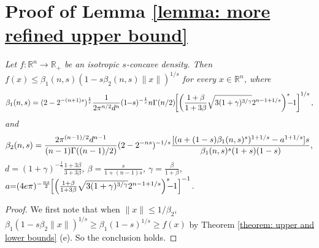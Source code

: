 \documentclass[11pt]{article}
\newcommand{\R}{\mathbb{R}}
\newcommand{\red}[1]{{\color{black}#1}}
\begin{document}
{{{{\section{Proof of Lemma \ref{lemma: more refined upper bound}}
\label{section: proof of more refined upper bound}

\emph{Let $f:\R^n\rightarrow \R_+$ be an isotropic $s$-concave density. Then $f(x)\le \beta_1(n,s)(1-s\beta_2(n,s)\|x\|)^{1/s}$ for every $x\in\R^n$, where
\begin{equation*}
\red{\beta_1(n,s)=(2-2^{-(n+1)s})^{\frac{1}{s}}\frac{1}{2\pi^{n/2}d^n}(1\hspace{-0.1cm}-\hspace{-0.1cm}s)^{-\frac{1}{s}}n\Gamma(n/2)\hspace{-0.1cm}\left[\left(\frac{1+\beta}{1+3\beta}\sqrt{3(1+\gamma)^{3/\gamma}}2^{n-1+1/s}\right)^{s}\hspace{-0.2cm}-\hspace{-0.1cm}1\right]^{1/s},}
\end{equation*}
and
\begin{equation*}
\red{\beta_2(n,s)=\frac{2\pi^{(n-1)/2}d^{n-1}}{(n-1)\Gamma((n-1)/2)}(2-2^{-ns})^{-1/s}\frac{[(a+(1-s)\beta_1(n,s)^s)^{1+1/s}-a^{1+1/s}]s}{\beta_1(n,s)^s(1+s)(1-s)},}
\end{equation*}
$d=(1+\gamma)^{-\frac{1}{\gamma}}\frac{1+3\beta}{3+3\beta}$, $\beta=\frac{s}{1+(n-1)s}$, $\gamma=\frac{\beta}{1+\beta}$, $a\hspace{-0.1cm}=\hspace{-0.1cm}(4e\pi)^{-\frac{ns}{2}}\hspace{-0.1cm}\left[\left(\frac{1+\beta}{1+3\beta}\sqrt{3(1+\gamma)^{3/\gamma}}2^{n-1+1/s}\right)^{s}\hspace{-0.2cm}-\hspace{-0.1cm}1\right]^{-1}$.}

\medskip
\begin{proof}
We first note that when $\|x\|\le 1/\beta_2$, $\beta_1(1-s\beta_2\|x\|)^{1/s}\ge \beta_1(1-s)^{1/s}\ge f(x)$ by Theorem \ref{theorem: upper and lower bounds} (e). So the conclusion holds.


\end{proof}}}}}
\end{document}
